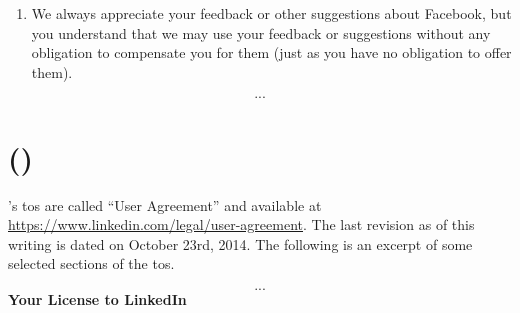 \documentclass[showtrims,oldfontcommands]{kthesis}
\begin{document}
\begin{appendices}
\begin{quote_tos}
\begin{enumerate}
            \item We always appreciate your feedback or other suggestions about Facebook, 
            but you understand that we may use your feedback or suggestions without any 
            obligation to compensate you for them (just as you have no obligation to offer 
            them).
        \end{enumerate}
        \[...\]
    \end{quote_tos}

    \section[\LinkedIn]{\LinkedIn (\LinkedInCorp)}
        \label{section:excerpts-linkedin}
    \LinkedIn's \acs{tos} are called ``User Agreement'' and available at \url{https://www.linkedin.com/legal/user-agreement}. 
    The last revision as of this writing is dated on October 23rd, 2014. The following 
    is an excerpt of some selected sections of the \ac{tos}.

    \begin{quote_tos}
        \[...\]
        \textbf{Your License to LinkedIn}
        

\end{quote_tos}
\end{appendices}
\end{document}
